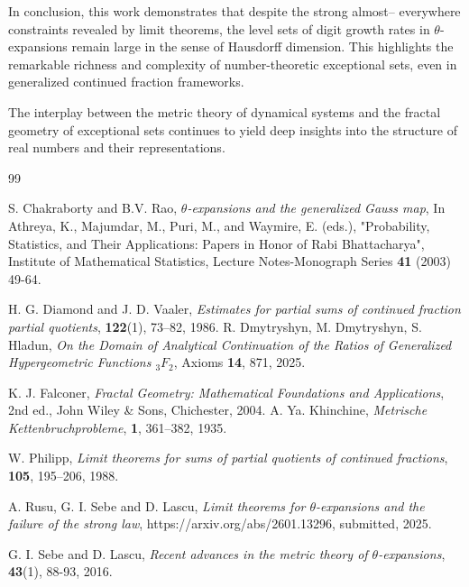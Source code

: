 \documentclass{article}
\numberwithin{equation}{section}
\begin{document}
In conclusion, this work demonstrates that despite the strong almost-- everywhere constraints revealed by limit theorems, the level sets of digit growth rates in $\theta$-expansions remain large in the sense of Hausdorff dimension. This highlights the remarkable richness and complexity of number-theoretic exceptional sets, even in generalized continued fraction frameworks.

The interplay between the metric theory of dynamical systems and the fractal geometry of exceptional sets continues to yield deep insights into the structure of real numbers and their representations.

\begin{thebibliography}{99}

{S. Chakraborty and B.V. Rao, \textit{$\theta$-expansions and the generalized Gauss map},
In Athreya, K., Majumdar, M., Puri, M., and Waymire, E. (eds.), "Probability, Statistics, and Their Applications: Papers in Honor of Rabi Bhattacharya", Institute of Mathematical Statistics, Lecture Notes-Monograph Series \textbf{41} (2003) 49-64.}

H. G. Diamond and J. D. Vaaler,
\newblock \textit{Estimates for partial sums of continued fraction partial quotients},
 \textbf{122}(1), 73--82, 1986.
{R. Dmytryshyn, M. Dmytryshyn, S. Hladun, \textit{On the Domain of Analytical Continuation of the Ratios of Generalized Hypergeometric Functions $_3F_2$}, Axioms \textbf{14}, 871, 2025.}

{K. J. Falconer,
\textit{Fractal Geometry: Mathematical Foundations and Applications},
2nd ed., John Wiley \& Sons, Chichester, 2004.}
A. Ya. Khinchine,
\newblock \textit{Metrische Kettenbruchprobleme},
 \textbf{1}, 361--382, 1935.

W. Philipp, \textit{Limit theorems for sums of partial quotients of continued fractions}, 
 \textbf{105}, 195--206, 1988.

A. Rusu, G. I. Sebe and D. Lascu,
\textit{Limit theorems for $\theta$-expansions and the failure of the strong law}, https://arxiv.org/abs/2601.13296,
\newblock submitted, 2025.

G. I. Sebe and D. Lascu,
\textit{Recent advances in the metric theory of $\theta$-expansions},
\textbf{43}(1), 88-93, 2016.


\end{thebibliography}
\end{document}
